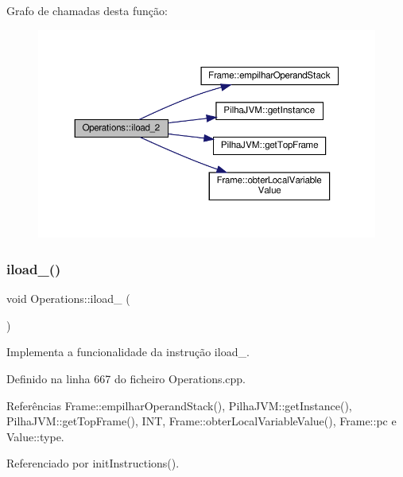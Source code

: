 Grafo de chamadas desta função\+:\nopagebreak
\begin{figure}[H]
\begin{center}
\leavevmode
\includegraphics[width=350pt]{classOperations_affa5afeadb98117ea0ee66cf2687eb0a_cgraph}
\end{center}
\end{figure}
\mbox{\label{classOperations_a3f645534291129289ee71c708dbe633c}} 
\subsubsection{\texorpdfstring{iload\+\_()}{iload\_3()}}
{\footnotesize\ttfamily void Operations\+::iload\+\_ (\begin{DoxyParamCaption}{ }\end{DoxyParamCaption})\hspace{0.3cm}{\ttfamily [private]}}



Implementa a funcionalidade da instrução iload\+\_. 



Definido na linha 667 do ficheiro Operations.\+cpp.



Referências Frame\+::empilhar\+Operand\+Stack(), Pilha\+J\+V\+M\+::get\+Instance(), Pilha\+J\+V\+M\+::get\+Top\+Frame(), I\+NT, Frame\+::obter\+Local\+Variable\+Value(), Frame\+::pc e Value\+::type.



Referenciado por init\+Instructions().

